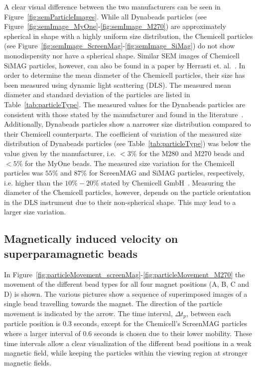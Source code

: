 A clear visual difference between the two manufacturers can be seen in Figure~\ref{fig:semParticleImages}. While all Dynabeads particles (see Figure~\ref{fig:semImage_MyOne}-\ref{fig:semImage_M270}) are approximately spherical in shape with a highly uniform size distribution, the Chemicell particles (see Figure~\ref{fig:semImage_ScreenMag}-\ref{fig:semImage_SiMag}) do not show monodispersity nor have a spherical shape. Similar SEM images of Chemicell SiMAG particles, however, can also be found in a paper by Herrasti et. al.~\cite{Herrasti2016}. In order to determine the mean diameter of the Chemicell particles, their size has been measured using dynamic light scattering (DLS). The measured mean diameter and standard deviation of the particles are listed in Table~\ref{tab:particleType}. The measured values for the Dynabeads particles are consistent with those stated by the manufacturer and found in the literature~\cite{Fonnum2005,dynabeads2015}. Additionally, Dynabeads particles show a narrower size distribution compared to their Chemicell counterparts. The coefficient of variation of the measured size distribution of Dynabeads particles (see Table~\ref{tab:particleType}) was below the value given by the manufacturer, i.e. $<3\%$ for the M280 and M270 beads and $<5\%$ for the MyOne beads. The measured size variation for the Chemicell particles was $55\%$ and $87\%$ for ScreenMAG and SiMAG particles, respectively, i.e. higher than the $10\%-20\%$ stated by Chemicell GmbH~\cite{chemicellConversation}. Measuring the diameter of the Chemicell particles, however, depends on the particle orientation in the DLS instrument due to their non-spherical shape. This may lead to a larger size variation.


\subsection{Magnetically induced velocity on superparamagnetic beads}\label{subsec:magneticallyInducedVelocityOnSuperparamagneticParticles}
In Figure~\ref{fig:particleMovement_screenMag}-\ref{fig:particleMovement_M270} the movement of the different bead types for all four magnet positions (A, B, C and D) is shown. The various pictures show a sequence of superimposed images of a single bead travelling towards the magnet. The direction of the particle movement is indicated by the arrow. The time interval, $\Delta t_{p}$, between each particle position is $0.3$ seconds, except for the Chemicell's ScreenMAG particles where a larger interval of $0.6$ seconds is chosen due to their lower mobility. These time intervals allow a clear visualization of the different bead positions in a weak magnetic field, while keeping the particles within the viewing region at stronger magnetic fields. 

